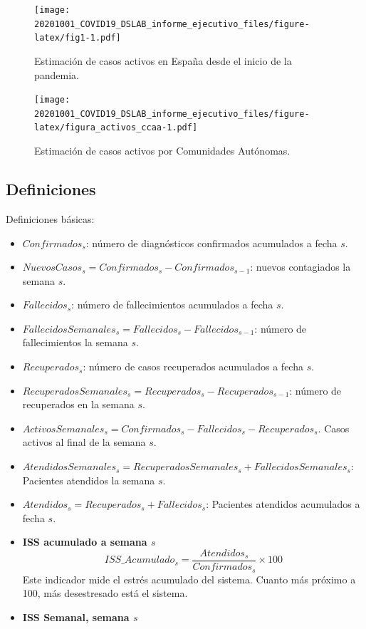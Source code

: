 \documentclass[
  11pt,
]{article}
\begin{document}
\vspace{0.2cm}

\begin{figure}
\centering
\texttt{[image: 20201001\_COVID19\_DSLAB\_informe\_ejecutivo\_files/figure-latex/fig1-1.pdf]}
\caption{\label{fig:fig17a_res} Estimación de casos activos en España
desde el inicio de la pandemia.}
\end{figure}

\begin{figure}
\centering
\texttt{[image: 20201001\_COVID19\_DSLAB\_informe\_ejecutivo\_files/figure-latex/figura\_activos\_ccaa-1.pdf]}
\caption{\label{fig:figura_activos_ccaa} Estimación de casos activos por
Comunidades Autónomas.}
\end{figure}

\clearpage

\hypertarget{definiciones}{%
\subsection{Definiciones}\label{definiciones}}

Definiciones básicas:

\begin{itemize}
\item
  \(Confirmados_s\): número de diagnósticos confirmados acumulados a
  fecha \(s\).
\item
  \(NuevosCasos_{s} = Confirmados_{s} - Confirmados_{s-1}\): nuevos
  contagiados la semana \(s\).
\item
  \(Fallecidos_s\): número de fallecimientos acumulados a fecha \(s\).
\item
  \(FallecidosSemanales_s = Fallecidos_{s} - Fallecidos_{s-1}\): número
  de fallecimientos la semana \(s\).
\item
  \(Recuperados_s\): número de casos recuperados acumulados a fecha
  \(s\).
\item
  \(RecuperadosSemanales_{s} = Recuperados_{s} - Recuperados_{s-1}\):
  número de recuperados en la semana \(s\).
\item
  \(ActivosSemanales_s = Confirmados_s - Fallecidos_s - Recuperados_s\).
  Casos activos al final de la semana \(s\).
\item
  \(AtendidosSemanales_{s} = RecuperadosSemanales_s + FallecidosSemanales_s\):
  Pacientes atendidos la semana \(s\).
\item
  \(Atendidos_{s} = Recuperados_s + Fallecidos_s\): Pacientes atendidos
  acumulados a fecha \(s\).
\item
  \textbf{ISS acumulado a semana \(s\)}
  \[ISS\_Acumulado_s = \frac{Atendidos_s}{Confirmados_s} \times 100\]
  Este indicador mide el estrés acumulado del sistema. Cuanto más
  próximo a 100, más desestresado está el sistema.
\item
  \textbf{ISS Semanal, semana \(s\)}
\end{itemize}
\end{document}
